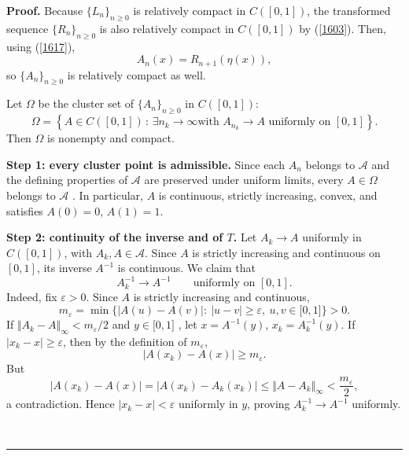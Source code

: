 \documentclass[onecolumn]{article}
\newenvironment{proof}[1][Proof]{\noindent\textbf{#1.} }{\ \rule{0.5em}{0.5em}}
\begin{document}
\begin{proof}
Because $\{L_{n}\}_{n\geq 0}$ is relatively compact in $C([0,1])$, the
transformed sequence $\{R_{n}\}_{n\geq 0}$ is also relatively compact in $%
C([0,1])$ by (\ref{1603}). Then, using (\ref{1617}), 
\begin{equation}
A_{n}(x)=R_{n+1}(\eta (x)),  \label{1686}
\end{equation}%
so $\{A_{n}\}_{n\geq 0}$ is relatively compact as well.

Let $\Omega $ be the cluster set of $\{A_{n}\}_{n\geq 0}$ in $C([0,1])$: 
\begin{equation}
\Omega =\left\{ A\in C([0,1])\,:\,\exists n_{k}\rightarrow \infty \text{
with }A_{n_{k}}\rightarrow A\text{ uniformly on }[0,1]\right\} .
\label{1687}
\end{equation}%
Then $\Omega $ is nonempty and compact.

\textbf{Step 1: every cluster point is admissible.} Since each $A_{n}$
belongs to $\mathcal{A}$ and the defining properties of $\mathcal{A}$ are
preserved under uniform limits, every $A\in \Omega $ belongs to $\mathcal{A}$%
. In particular, $A$ is continuous, strictly increasing, convex, and
satisfies $A(0)=0$, $A(1)=1$.

\textbf{Step 2: continuity of the inverse and of $T$.} Let $A_{k}\rightarrow
A$ uniformly in $C([0,1])$, with $A_{k},A\in \mathcal{A}$. Since $A$ is
strictly increasing and continuous on $[0,1]$, its inverse $A^{-1}$ is
continuous. We claim that 
\begin{equation}
A_{k}^{-1}\rightarrow A^{-1}\qquad \text{uniformly on }[0,1].  \label{1688}
\end{equation}%
Indeed, fix $\varepsilon >0$. Since $A$ is strictly increasing and
continuous, 
\begin{equation}
m_{\varepsilon }=\min \{|A(u)-A(v)|:\ |u-v|\geq \varepsilon ,\ u,v\in
\lbrack 0,1]\}>0.  \label{1689}
\end{equation}%
If $\Vert A_{k}-A\Vert _{\infty }<m_{\varepsilon }/2$ and $y\in \lbrack 0,1]$%
, let $x=A^{-1}(y)$, $x_{k}=A_{k}^{-1}(y)$. If $|x_{k}-x|\geq \varepsilon $,
then by the definition of $m_{\varepsilon }$, 
\begin{equation}
|A(x_{k})-A(x)|\geq m_{\varepsilon }.  \label{1690}
\end{equation}%
But 
\begin{equation}
|A(x_{k})-A(x)|=|A(x_{k})-A_{k}(x_{k})|\leq \Vert A-A_{k}\Vert _{\infty }<%
\frac{m_{\varepsilon }}{2},  \label{1691}
\end{equation}%
a contradiction. Hence $|x_{k}-x|<\varepsilon $ uniformly in $y$, proving $%
A_{k}^{-1}\rightarrow A^{-1}$ uniformly.


\end{proof}
\end{document}
